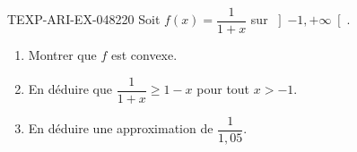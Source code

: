 \begin{exercice}{TEXP-ARI-EX-048}{2}{20}
Soit $f(x) = \dfrac{1}{1+x}$ sur $\left]-1, +\infty\right[$.
\begin{enumerate}
  \item Montrer que $f$ est convexe.
  \item En déduire que $\dfrac{1}{1+x} \geq 1 - x$ pour tout $x > -1$.
  \item En déduire une approximation de $\dfrac{1}{1{,}05}$.
\end{enumerate}

\end{exercice}
